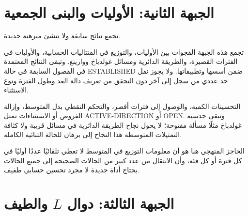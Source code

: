 \section{الجبهة الثانية: الأوليات والبنى الجمعية}

\begin{remark}
\label{map:ch26-primes-additive}
\noindent{}\quad تجمع نتائج سابقة ولا تنشئ مبرهنة جديدة.\par
تجمع هذه الجبهة الفجوات بين الأوليات، والتوزيع في المتتاليات الحسابية،
والأوليات في الفترات القصيرة، والطريقة الدائرية ومسائل غولدباخ ووارينغ.
وتبقى النتائج المعتمدة في الفصول السابقة في حالة
\textenglish{ESTABLISHED} ضمن أسسها وتطبيقاتها. ولا يجوز نقل حد عددي من
سجل إلى آخر دون التحقق من تعريف دالة العد وطول الفترة ونوع الاستثناء.

التحسينات الكمية، والوصول إلى فترات أقصر، والتحكم النقطي بدل المتوسط، وإزالة الفروض أو الاستثناءات تمثل \textenglish{ACTIVE-DIRECTION} أو \textenglish{OPEN}. وتبقى حدسية غولدباخ مثلًا مسألة مفتوحة؛ لا يحول نجاح الطريقة الدائرية في مسائل قريبة ولا كثافة التمثيلات المتوسطة هذا النجاح إلى برهان للحالة الثنائية الكاملة.

الحاجز المنهجي هنا هو أن معلومات التوزيع في المتوسط لا تعطي تلقائيًا عددًا أوليًا في كل فترة أو كل فئة، وأن الانتقال من عدد كبير من الحالات الصحيحة إلى جميع الحالات يحتاج أداة جديدة لا مجرد تحسين حسابي طفيف.
\end{remark}

\section{الجبهة الثالثة: دوال \texorpdfstring{$L$}{L} والطيف}

